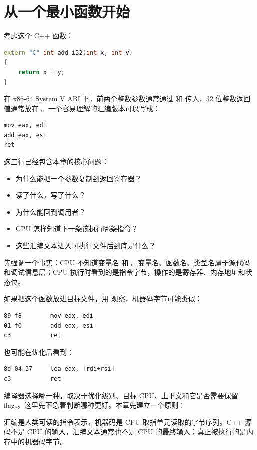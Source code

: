 \section{从一个最小函数开始}

考虑这个 C++ 函数：

\begin{lstlisting}[language=C++]
extern "C" int add_i32(int x, int y)
{
    return x + y;
}
\end{lstlisting}

在 x86-64 System V ABI 下，前两个整数参数通常通过  和  传入，32 位整数返回值通常放在 。一个容易理解的汇编版本可以写成：

\begin{lstlisting}
mov eax, edi
add eax, esi
ret
\end{lstlisting}

这三行已经包含本章的核心问题：

\begin{itemize}
  \item {} 为什么能把一个参数复制到返回寄存器？
  \item {} 读了什么，写了什么？
  \item {} 为什么能回到调用者？
  \item CPU 怎样知道下一条该执行哪条指令？
  \item 这些汇编文本进入可执行文件后到底是什么？
\end{itemize}

先强调一个事实：CPU 不知道变量名  和 。变量名、函数名、类型名属于源代码和调试信息层；CPU 执行时看到的是指令字节，操作的是寄存器、内存地址和状态位。

如果把这个函数放进目标文件，用  观察，机器码字节可能类似：

\begin{lstlisting}
89 f8        mov eax, edi
01 f0        add eax, esi
c3           ret
\end{lstlisting}

也可能在优化后看到：

\begin{lstlisting}
8d 04 37     lea eax, [rdi+rsi]
c3           ret
\end{lstlisting}

编译器选择哪一种，取决于优化级别、目标 CPU、上下文和它是否需要保留 flags。这里先不急着判断哪种更好。本章先建立一个原则：

\begin{mentalmodel}
汇编是人类可读的指令表示，机器码是 CPU 取指单元读取的字节序列。C++ 源码不是 CPU 的输入，汇编文本通常也不是 CPU 的最终输入；真正被执行的是内存中的机器码字节。
\end{mentalmodel}


